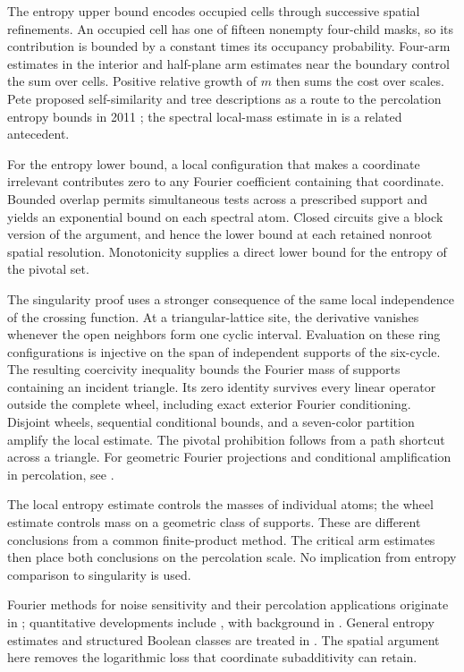 The entropy upper bound encodes occupied cells through successive spatial refinements. An occupied cell has one of fifteen nonempty four-child masks, so its contribution is bounded by a constant times its occupancy probability. Four-arm estimates in the interior and half-plane arm estimates near the boundary control the sum over cells. Positive relative growth of $m$ then sums the cost over scales. Pete proposed self-similarity and tree descriptions as a route to the percolation entropy bounds in 2011 \cite[slides~21--22]{Pete}; the spectral local-mass estimate in \cite[Lemma~3.2 and equation~(3.7)]{GPS} is a related antecedent.

For the entropy lower bound, a local configuration that makes a coordinate irrelevant contributes zero to any Fourier coefficient containing that coordinate. Bounded overlap permits simultaneous tests across a prescribed support and yields an exponential bound on each spectral atom. Closed circuits give a block version of the argument, and hence the lower bound at each retained nonroot spatial resolution. Monotonicity supplies a direct lower bound for the entropy of the pivotal set.

The singularity proof uses a stronger consequence of the same local independence of the crossing function. At a triangular-lattice site, the derivative vanishes whenever the open neighbors form one cyclic interval. Evaluation on these ring configurations is injective on the span of independent supports of the six-cycle. The resulting coercivity inequality bounds the Fourier mass of supports containing an incident triangle. Its zero identity survives every linear operator outside the complete wheel, including exact exterior Fourier conditioning. Disjoint wheels, sequential conditional bounds, and a seven-color partition amplify the local estimate. The pivotal prohibition follows from a path shortcut across a triangle. For geometric Fourier projections and conditional amplification in percolation, see \cite[Lemma~4.3 and Propositions~5.1 and~6.1]{GPS}.

The local entropy estimate controls the masses of individual atoms; the wheel estimate controls mass on a geometric class of supports. These are different conclusions from a common finite-product method. The critical arm estimates then place both conclusions on the percolation scale. No implication from entropy comparison to singularity is used.

Fourier methods for noise sensitivity and their percolation applications originate in \cite{BKS}; quantitative developments include \cite{SS,GPS,TV}, with background in \cite{GS}. General entropy estimates and structured Boolean classes are treated in \cite{KMS,KKLMS,Han,OWZ,OT,CKLS,WWW,GMP}. The spatial argument here removes the logarithmic loss that coordinate subadditivity can retain.

